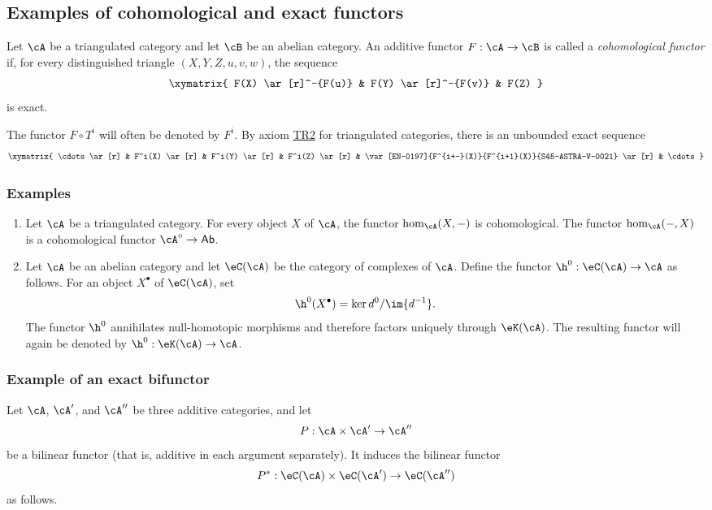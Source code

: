 \subsection{Examples of cohomological and exact functors}\label{VIII:1-3}

\begin{definition}
Let $\cA$ be a triangulated category and let $\cB$ be an abelian category.
An additive functor $F:\cA\to \cB$ is called a \emph{cohomological
functor} if, for every distinguished triangle $(X,Y,Z,u,v,w)$, the
sequence
\[\xymatrix{
  F(X) \ar[r]^-{F(u)}
    & F(Y) \ar[r]^-{F(v)}
    & F(Z)
}\]
is exact.
\end{definition}

The functor $F\circ T^i$ will often be denoted by $F^i$. By axiom
\hyperlink{VIII:TR2}{TR2} for triangulated categories, there is an
unbounded exact sequence
\[\xymatrix{
  \cdots \ar[r]
    & F^i(X) \ar[r]
    & F^i(Y) \ar[r]
    & F^i(Z) \ar[r]
    & \var[EN-0197]{F^{i+-}(X)}{F^{i+1}(X)}{S45-ASTRA-V-0021} \ar[r]
    & \cdots
}\]

\subsubsection{Examples}\label{VIII:1-3-2}

\begin{enumerate}
  \item Let $\cA$ be a triangulated category. For every object $X$ of
    $\cA$, the functor $\hom_\cA(X,-)$ is cohomological. The functor
    $\hom_\cA(-,X)$ is a cohomological functor
    $\cA^\circ\to\mathsf{Ab}$.
  \item Let $\cA$ be an abelian category and let $\eC(\cA)$ be the category
    of complexes of $\cA$. Define the functor
    $\h^0:\eC(\cA)\to\cA$ as follows. For an object $X^\bullet$ of
    $\eC(\cA)$, set
    \[
      \h^0(X^\bullet) = \ker d^0 / \im{d^{-1}} \text{.}
    \]
    The functor $\h^0$ annihilates null-homotopic morphisms and therefore
    factors uniquely through $\eK(\cA)$. The resulting functor will again
    be denoted by $\h^0:\eK(\cA) \to \cA$.
\end{enumerate}

\subsubsection{Example of an exact bifunctor}\label{VIII:1-3-3}

Let $\cA$, $\cA'$, and $\cA''$ be three additive categories, and let
\[
  P:\cA\times \cA'\to \cA''
\]
be a bilinear functor (that is, additive in each argument separately).
It induces the bilinear functor
\[
  P^\ast:\eC(\cA)\times \eC(\cA') \to \eC(\cA'')
\]
as follows.

